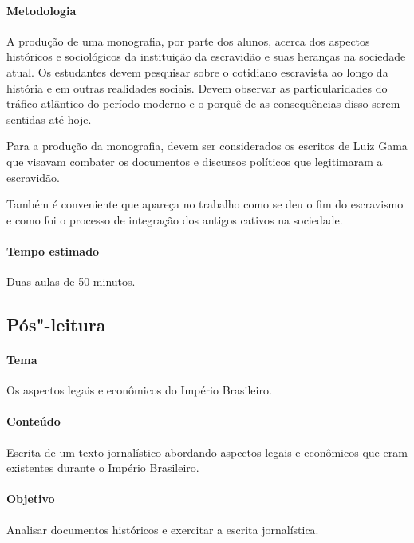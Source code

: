 \documentclass[12pt]{extarticle}
\begin{document}
\paragraph{Metodologia} A produção de uma monografia, por parte dos alunos,
acerca dos aspectos históricos e sociológicos da instituição da escravidão
e suas heranças na sociedade atual. Os estudantes devem pesquisar sobre
o cotidiano escravista ao longo da história e em outras realidades sociais.
Devem observar as particularidades do tráfico atlântico do período moderno e 
o porquê de as consequências disso serem sentidas até hoje. 

Para a produção da monografia, devem ser considerados os escritos de Luiz Gama
que visavam combater os documentos e discursos políticos que legitimaram a escravidão.

Também é conveniente que apareça no trabalho como se deu o fim do
escravismo e como foi o processo de integração dos antigos cativos na
sociedade.

\paragraph{Tempo estimado} Duas aulas de 50 minutos.

\subsection{Pós"-leitura}


\paragraph{Tema} Os aspectos legais e econômicos do Império Brasileiro.

\paragraph{Conteúdo} Escrita de um texto jornalístico abordando aspectos legais e
econômicos que eram existentes durante o Império Brasileiro.

\paragraph{Objetivo} Analisar documentos históricos e exercitar a escrita jornalística.
\end{document}
